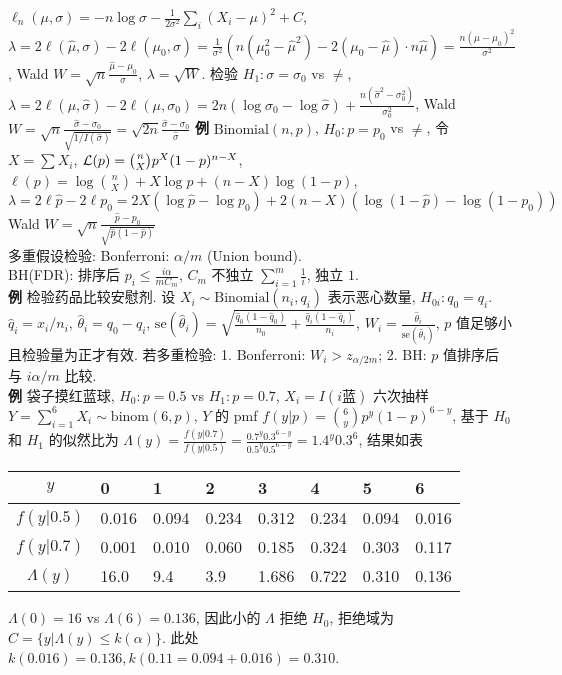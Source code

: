 \documentclass[a4paper, landscape,10pt]{article}
\begin{document}
\begin{multicols}{4}
$\ell_n(\mu, \sigma) = -n \log \sigma - \frac{1}{2\sigma^2} \sum_{i} (X_i - \mu)^2 + C$,
$
\lambda = 2 \ell(\hat \mu, \sigma) - 2 \ell(\mu_0, \sigma)
= \frac {1}{\sigma^2} \left(n (\mu_0 ^ 2 - \hat \mu ^ 2) - 2 (\mu_0 - \hat \mu) \cdot n \hat \mu \right)
= \frac{n (\hat \mu - \mu_0)^2} {\sigma^2}
$, Wald $W = \sqrt{n} \frac{\hat \mu - \mu_0} {\sigma}$, $\lambda = \sqrt{W}$.
检验 $H_1 : \sigma = \sigma_0$ vs $\neq$,
$\lambda = 2 \ell(\mu, \hat \sigma) - 2 \ell(\mu, \sigma_0) =  2n (\log \sigma_0 - \log \hat \sigma) + \frac {n (\hat \sigma ^ 2 - \sigma_0 ^ 2)}{\sigma_0^2}$,
Wald $W = \sqrt{n} \frac{\hat \sigma - \sigma_0} {\sqrt{1 / I(\hat \sigma)}} = 
\sqrt{2n} \frac {\hat \sigma - \sigma_0 } {\hat \sigma}$
{\bfseries 例} $\mathrm{Binomial}(n, p)$, $H_0 : p = p_0$ vs $\neq$,
令 $X = \sum X_i$, ${\cal L}(p) = {n \choose X} p ^ X (1 - p) ^ {n - X}$,
$\ell(p) = \log {n \choose X} + X \log p + (n - X) \log (1 - p)$,
$\lambda = 2 \ell{\hat p} - 2 \ell{p_0} = 2 X (\log \hat p - \log p_0) + 2 (n - X) (\log (1 - \hat p) - \log (1 - p_0))$
Wald $ W = \sqrt{n} \frac {\hat p - p_0} {\sqrt {\hat p (1 - \hat p)}}$\\
多重假设检验: Bonferroni: $\alpha / m$ (Union bound). \\
BH(FDR): 排序后 $p_i \leq \frac{i \alpha}{m C_m} $, $C_m$ 不独立 $\sum_{i = 1}^m \frac{1}{i}$, 独立 $1$. \\
{\bfseries 例} 检验药品比较安慰剂. 设 $X_i \sim \mathrm{Binomial}(n_i, q_i)$ 表示恶心数量, $H_{0i}:q_0 = q_i$.
$\hat q_i = x_i / n_i$,
$\hat \theta_i = q_0 - q_i$,
$\mathrm{se}(\hat \theta_i) = \sqrt{\frac{\hat q_0 (1 - \hat q_0)}{n_0} + \frac{\hat q_i (1 - \hat q_i)}{n_i}}$,
$W_i = \frac{\hat \theta_i}{\mathrm{se}(\hat \theta_i)}$, $p$ 值足够小且检验量为正才有效.
若多重检验: 1. Bonferroni: $W_i > z_{\alpha / 2m}$; 2. BH: $p$ 值排序后与 $i \alpha / m$ 比较. \\ 

\newcolumn
{\bfseries 例} 袋子摸红蓝球, $H_0 : p = 0.5$ vs $H_1 : p = 0.7$, $X_i = I(i \text{蓝})$
六次抽样 $Y=\sum_{i=1}^6 X_i \sim \mathrm{binom}(6,p)$, $Y$ 的 pmf $f(y|p) = {6 \choose y} p^y (1 - p)^{6 - y}$,
基于 $H_0$ 和 $H_1$ 的似然比为 $\Lambda(y) = \frac{f(y|0.7)}{f(y|0.5)} = \frac{0.7^y 0.3^{6 - y}}{0.5^y 0.5^{6 - y}} = 1.4^y 0.3^6$,
结果如表
\begin{tiny}
\begin{tabular}{c|lllllll}
	$y$ & 0 & 1 & 2 & 3 & 4 & 5 & 6 \\
	\hline
	$f(y | 0.5)$ & 0.016 & 0.094 & 0.234 & 0.312 & 0.234 & 0.094 & 0.016 \\
	$f(y | 0.7)$ & 0.001 & 0.010 & 0.060 & 0.185 & 0.324 & 0.303 & 0.117 \\
	$\Lambda(y)$ & 16.0 & 9.4 & 3.9 & 1.686 & 0.722 & 0.310 & 0.136 \\
\end{tabular}
\end{tiny}
$\Lambda(0) = 16$ vs $\Lambda(6) = 0.136$, 因此小的 $\Lambda$ 拒绝 $H_0$,
拒绝域为 $C=\{y | \Lambda(y) \leq k(\alpha)\}$. 此处 $k(0.016) = 0.136, k(0.11 = 0.094+0.016)=0.310$.


\end{multicols}
\end{document}
